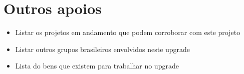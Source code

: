 \chapter{Outros apoios}

\begin{itemize}
	\item Listar os projetos em andamento que podem corroborar com este projeto
	\item Listar outros grupos brasileiros envolvidos neste upgrade
	\item Lista do bens que existem para trabalhar no upgrade
\end{itemize}